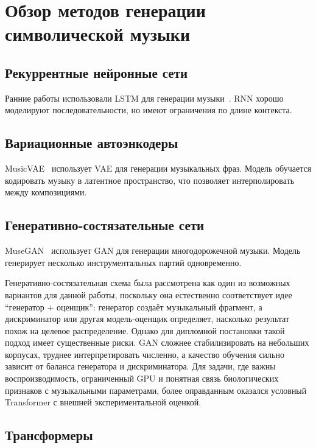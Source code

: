 \section{Обзор методов генерации символической музыки}

\subsection{Рекуррентные нейронные сети}

Ранние работы использовали LSTM для генерации музыки~\cite{eck2002}. RNN хорошо моделируют последовательности, но имеют ограничения по длине контекста.

\subsection{Вариационные автоэнкодеры}

MusicVAE~\cite{roberts2018} использует VAE для генерации музыкальных фраз. Модель обучается кодировать музыку в латентное пространство, что позволяет интерполировать между композициями.

\subsection{Генеративно-состязательные сети}

MuseGAN~\cite{dong2018} использует GAN для генерации многодорожечной музыки. Модель генерирует несколько инструментальных партий одновременно.

Генеративно-состязательная схема была рассмотрена как один из возможных вариантов для данной работы, поскольку она естественно соответствует идее ``генератор + оценщик'': генератор создаёт музыкальный фрагмент, а дискриминатор или другая модель-оценщик определяет, насколько результат похож на целевое распределение. Однако для дипломной постановки такой подход имеет существенные риски. GAN сложнее стабилизировать на небольших корпусах, труднее интерпретировать численно, а качество обучения сильно зависит от баланса генератора и дискриминатора. Для задачи, где важны воспроизводимость, ограниченный GPU и понятная связь биологических признаков с музыкальными параметрами, более оправданным оказался условный Transformer с внешней экспериментальной оценкой.

\subsection{Трансформеры}

